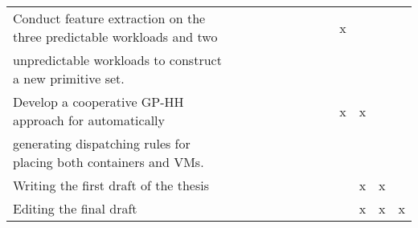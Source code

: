 \begin{table}
\begin{center}
{\begin{tabular}{|l||cccc|cccc|cccc|}
\cellcolor{LightCyan} Conduct feature extraction on the three predictable workloads and two  &&&&&&&&&x&&&\\ 
\cellcolor{LightCyan} unpredictable workloads to construct a new primitive set. &&&&&&&&&&&& \\ [1mm]

Develop a cooperative GP-HH approach for automatically   &&&&&&&&&x&x&& \\ [1mm]
generating dispatching rules for placing both containers and VMs. &&&&&&&&&&&&\\ [1mm]
\cellcolor{LightCyan}  Writing the first draft of the thesis &&&&&&&&&&x&x&  \\ \hline
 Editing the final draft   &&&&&&&&&&x&x&x \\ \hline

\end{tabular}
}
\end{center}
\end{table}


